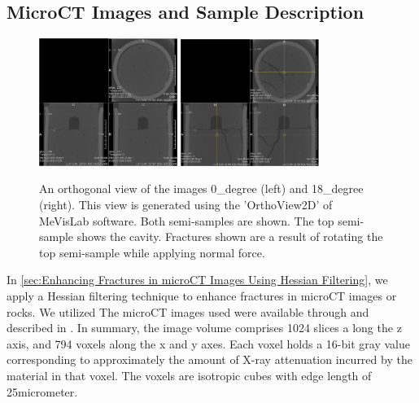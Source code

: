 \documentclass{edger}
\begin{document}
\subsection{MicroCT Images and Sample Description}

\begin{figure}[!h]
\centering
\includegraphics[width=0.4\textwidth]{0_degreeOrthoView.png}
\includegraphics[width=0.4\textwidth]{18_degreeOrthoView.png}
\caption{An orthogonal view of the images 0\_degree (left) and 18\_degree (right). This view is generated using the 'OrthoView2D' of MeVisLab software. Both semi-samples are shown. The top semi-sample shows the cavity. Fractures shown are a result of rotating the top semi-sample while applying normal force. }
\label{fig:18Degree}
\end{figure}

In \autoref{sec:Enhancing Fractures in microCT Images Using Hessian Filtering}, we apply a Hessian filtering technique to enhance fractures in microCT images or rocks. We utilized The microCT images used were available through \cite{Zhao2020} and described in \cite{Zhao2017,Zhao2020}. In summary, the image volume comprises 1024 slices a long the z axis, and 794 voxels along the x and y axes. Each voxel holds a 16-bit gray value corresponding to approximately the amount of X-ray attenuation incurred by the material in that voxel. The voxels are isotropic cubes with edge length of 25micrometer. 
\end{document}
